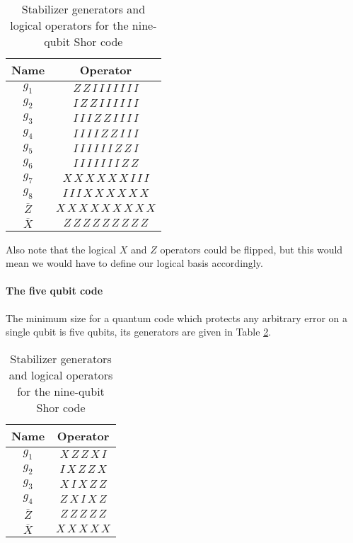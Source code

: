 \documentclass[11pt,a4paper]{article}
\theoremstyle{definition}
\theoremstyle{plain}
\theoremstyle{remark}
\begin{document}
\begin{table}[h]
\centering
\begin{tabular}{@{}c c@{}}
\toprule
Name & Operator \\
\midrule
$g_{1}$ & $Z\,Z\,I\,I\,I\,I\,I\,I\,I$ \\
$g_{2}$ & $I\,Z\,Z\,I\,I\,I\,I\,I\,I$ \\
$g_{3}$ & $I\,I\,I\,Z\,Z\,I\,I\,I\,I$ \\
$g_{4}$ & $I\,I\,I\,I\,Z\,Z\,I\,I\,I$ \\
$g_{5}$ & $I\,I\,I\,I\,I\,I\,Z\,Z\,I$ \\
$g_{6}$ & $I\,I\,I\,I\,I\,I\,I\,Z\,Z$ \\
$g_{7}$ & $X\,X\,X\,X\,X\,X\,I\,I\,I$ \\
$g_{8}$ & $I\,I\,I\,X\,X\,X\,X\,X\,X$ \\
$\overline Z$ & $X\,X\,X\,X\,X\,X\,X\,X\,X$ \\
$\overline X$ & $Z\,Z\,Z\,Z\,Z\,Z\,Z\,Z\,Z$ \\
\bottomrule
\end{tabular}
\caption{Stabilizer generators and logical operators for the nine-qubit Shor code}
\label{tab:generators-Shor}
\end{table}
Also note that the logical $X$ and $Z$ operators could be flipped, but this would mean we would have to define our logical 
basis accordingly. 

\paragraph{The five qubit code} 
The minimum size for a quantum code which protects any arbitrary error on a single qubit 
is five qubits, its generators are given in Table \ref{tab:generators-five-qubit}. 

\begin{table}[h]
\centering
\begin{tabular}{@{}c c@{}}
\toprule
Name & Operator \\
\midrule
$g_{1}$ & $X\,Z\,Z\,X\,I$ \\
$g_{2}$ & $I\,X\,Z\,Z\,X$ \\
$g_{3}$ & $X\,I\,X\,Z\,Z$ \\
$g_{4}$ & $Z\,X\,I\,X\,Z$ \\
$\overline Z$ & $Z\,Z\,Z\,Z\,Z$ \\
$\overline X$ & $X\,X\,X\,X\,X$ \\
\bottomrule
\end{tabular}
\caption{Stabilizer generators and logical operators for the nine-qubit Shor code}
\label{tab:generators-five-qubit}
\end{table}
\end{document}
